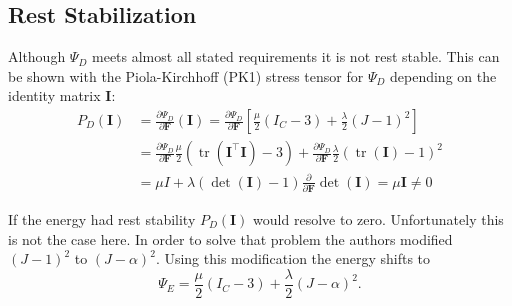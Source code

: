 
\subsection{Rest Stabilization}
Although $\Psi_{D}$ meets almost all stated requirements it is not rest stable. This can be shown with the Piola-Kirchhoff (PK1) stress tensor for $\Psi_D$ depending on the identity matrix $\mathbf{I}$:
\begin{align*}
P_{D}(\mathbf{I}) &= \frac{\partial \Psi_{D}}{\partial \mathbf{F}} (\mathbf{I}) = \frac{\partial \Psi_{D}}{\partial \mathbf{F}} \left[ \frac{\mu}{2}\left(I_{C}-3\right) +\frac{\lambda}{2}(J-1)^{2} \right] \\
&= \frac{\partial \Psi_{D}}{\partial \mathbf{F}}  \frac{\mu}{2}\left(\operatorname{tr}(\mathbf{I}^\intercal \mathbf{I})-3\right) +\frac{\partial \Psi_{D}}{\partial \mathbf{F}} \frac{\lambda}{2}(\operatorname{tr}(\mathbf{I})-1)^{2} \\
&= \mu I + \lambda (\operatorname{det}(\mathbf{I})-1)  \frac{\partial}{\partial \mathbf{F}} \operatorname{det}(\mathbf{I}) = \mu \mathbf{I} \neq 0
\end{align*}

If the energy had rest stability $P_{D}(\mathbf{I})$ would resolve to zero. Unfortunately this is not the case here. In order to solve that problem the authors modified $(J-1)^{2}$ to $(J-\alpha)^{2}$. Using this modification the energy shifts to
\[
\Psi_{E} = \frac{\mu}{2}\left(I_{C}-3\right) +\frac{\lambda}{2}(J-\alpha)^{2}.
\]

